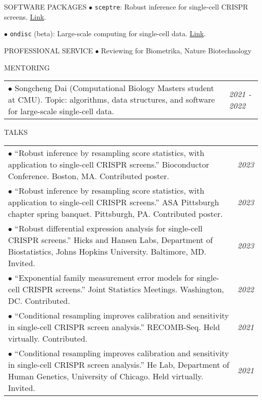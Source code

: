 \documentclass{resume} %
\begin{document}
\begin{rSection}{SOFTWARE PACKAGES}
	$\bullet$ \texttt{sceptre}: Robust inference for single-cell CRISPR screens. \href{https://katsevich-lab.github.io/sceptre/}{Link}.
	
	$\bullet$ \texttt{ondisc} (beta): Large-scale computing for single-cell data. \href{https://github.com/timothy-barry/ondisc}{Link}.
\end{rSection}

\begin{rSection}{PROFESSIONAL SERVICE}
	$\bullet$ Reviewing for Biometrika, Nature Biotechnology
\end{rSection}

\begin{rSection}{MENTORING}
	\begin{tabular}{p{14cm}R{2.5cm}}
		$\bullet$ Songcheng Dai (Computational Biology Masters student at CMU). Topic: algorithms, data structures, and software for large-scale single-cell data.
		& \textit{2021 - 2022} \\ 
	\end{tabular} 
\end{rSection}

\begin{rSection}{TALKS}
	
	\begin{tabular}{p{14cm}R{2.5cm}}
		$\bullet$ ``Robust inference by resampling score statistics, with application to single-cell CRISPR screens.'' Bioconductor Conference. Boston, MA. Contributed poster.&\textit{2023}\\
		
		$\bullet$ ``Robust inference by resampling score statistics, with application to single-cell CRISPR screens.'' ASA Pittsburgh chapter spring
		banquet. Pittsburgh, PA. Contributed poster. & \it{2023} \\
		
		$\bullet$ ``Robust differential expression analysis for single-cell CRISPR screens.'' Hicks and Hansen Labs, Department of Biostatistics, Johns Hopkins University. Baltimore, MD. Invited. & \it{2023} \\
		
		$\bullet$ ``Exponential family measurement error models for single-cell CRISPR screens.'' Joint Statistics Meetings. Washington, DC. Contributed.  & \it{2022} \\
		
		$\bullet$  ``Conditional resampling improves calibration and sensitivity in single-cell CRISPR screen analysis.'' RECOMB-Seq. Held virtually. Contributed. & \it{2021} \\
		
		$\bullet$ ``Conditional resampling improves calibration and sensitivity in single-cell CRISPR screen analysis.'' He Lab, Department of Human Genetics, University of Chicago. Held virtually. Invited. & \it{2021}
	\end{tabular}
	
\end{rSection}
\end{document}
